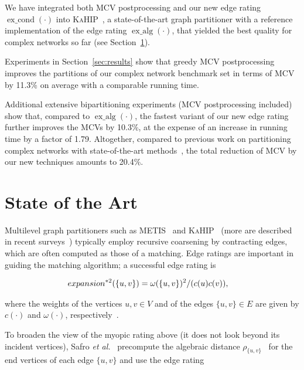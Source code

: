 \documentclass[pdftex]{llncs}
\newcommand{\excond}{\operatorname{ex\_cond}}
\newcommand{\exalg}{\operatorname{ex\_alg}}
\newcommand{\etal}{\textit{et al.}\xspace}
\newcommand{\metis}{\textsc{METIS}\xspace}
\newcommand{\kahip}{\textsc{KaHIP}\xspace}
\numberwithin{equation}{section}
\numberwithin{example}{section}
\numberwithin{table}{section}
\begin{document}
We have integrated both MCV postprocessing and our new edge rating
$\excond(\cdot)$ into \kahip~\cite{kaHIPHomePage,sandersschulz2013}, a
state-of-the-art graph partitioner with a reference implementation of
the edge rating $\exalg(\cdot)$, that yielded the best quality for
complex networks so far (see Section~\ref{sec:soa}).


Experiments in Section~\ref{sec:results} show that greedy MCV
postprocessing improves the partitions of our complex network
benchmark set in terms of MCV by 11.3\% on average with a comparable
running time.


Additional extensive bipartitioning experiments (MCV postprocessing
included) show that, compared to $\exalg(\cdot)$, the fastest variant
of our new edge rating further improves the MCVs by 10.3\%, at the
expense of an increase in running time by a factor of
1.79. Altogether, compared to previous work on partitioning complex
networks with state-of-the-art methods~\cite{Safro2012a}, the total
reduction of MCV by our new techniques amounts to 20.4\%.




\section{State of the Art}
\label{sec:soa}
Multilevel graph partitioners such as \metis~\cite{karypis1998fast} and \kahip~\cite{kaHIPHomePage,sandersschulz2013} (more are described in recent surveys~\cite{GPOverviewBook,SPPGPOverviewPaper}) typically employ recursive
coarsening by contracting edges, which are often computed as those of a matching.
Edge ratings are important in guiding the matching
algorithm; a successful edge rating is

\begin{align}
\vspace{-1ex}
expansion^{*2}(\{u, v\}) &= \omega(\{u, v\})^2 / (c(u) c(v))\label{eq:exp2},
\end{align}

\noindent where the weights of the vertices $u, v \in V$ and of the edges $\{u,
v\} \in E$ are given by $c(\cdot)$ and $\omega(\cdot)$, respectively~\cite{HoltgreweSS10engineering}.

To broaden the view of the myopic rating above (it does not look beyond its
incident vertices), Safro
\etal~\cite{Safro2012a} precompute the algebraic distance
$\rho_{\{u, v\}}$~\cite{Chen2011a} for the end vertices
of each edge $\{u, v\}$ and use the edge rating
\end{document}
